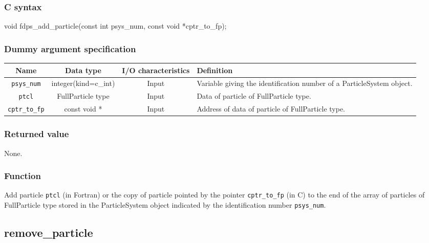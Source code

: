 \subsubsection*{C syntax}
\begin{screen}
\begin{spverbatim}
void fdps_add_particle(const int psys_num,
                       const void *cptr_to_fp);
\end{spverbatim}
\end{screen}

\subsubsection*{Dummy argument specification}
\begin{table}[h]
\begin{tabularx}{\linewidth}{cccX}
\toprule
\rowcolor{Snow2}
Name & Data type & I/O characteristics & Definition \\
\midrule
\texttt{psys\_num} & integer(kind=c\_int) & Input & Variable giving the identification number of a ParticleSystem object. \\
\texttt{ptcl} & FullParticle type & Input & Data of particle of FullParticle type. \\
\texttt{cptr\_to\_fp} & const void * & Input & Address of data of particle of FullParticle type.\\
\bottomrule
\end{tabularx}
\end{table}


\subsubsection*{Returned value}
None.

\subsubsection*{Function}
Add particle \texttt{ptcl} {\small (in Fortran)} or the copy of particle pointed by the pointer \texttt{cptr\_to\_fp} {\small (in C)} to the end of the array of particles of FullParticle type stored in the ParticleSystem object indicated by the identification number \texttt{psys\_num}.

\clearpage

\subsection{remove\_particle}
